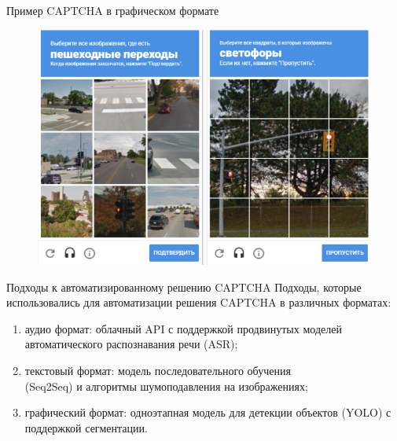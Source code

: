 \documentclass[12pt,a4paper,mathserif]{beamer}
\begin{document}
\begin{frame}{Пример CAPTCHA в графическом формате}
    \begin{figure}
        \centering
        \includegraphics[width=0.85\linewidth]{imgs/image-captcha.png}
    \end{figure}
\end{frame}

\begin{frame}{\large Подходы к автоматизированному решению CAPTCHA}
    \setlength{\parindent}{0.5cm}
    Подходы, которые использовались для автоматизации решения CAPTCHA в различных 
    форматах:

    \begin{enumerate}
        \item аудио формат: облачный API с поддержкой продвинутых моделей 
        автоматического распознавания речи (ASR);
        \item текстовый формат: модель последовательного обучения \\(Seq2Seq) и 
        алгоритмы шумоподавления на изображениях;
        \item графический формат: одноэтапная модель для детекции объектов (YOLO) 
        с поддержкой сегментации.
    \end{enumerate}
\end{frame}
\end{document}
